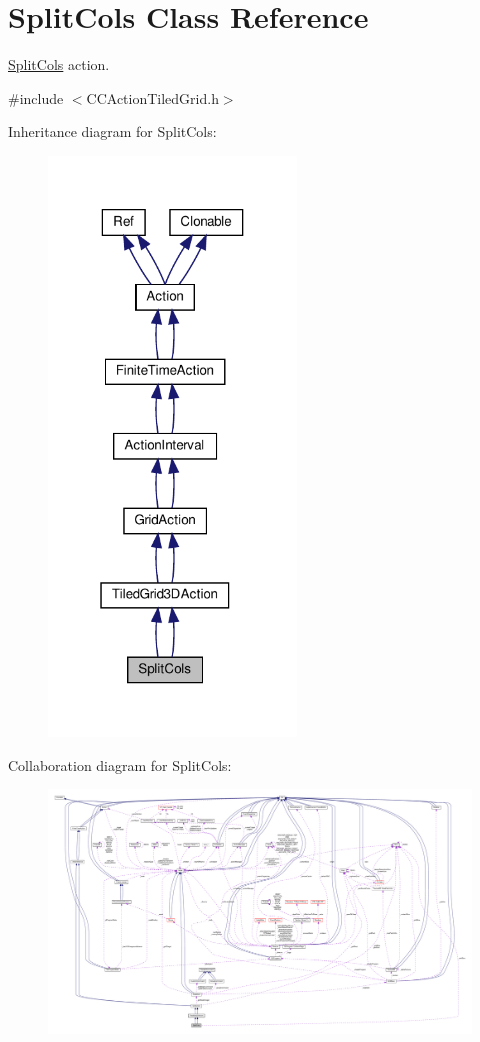 \hypertarget{classSplitCols}{}\section{Split\+Cols Class Reference}
\label{classSplitCols}


\hyperlink{classSplitCols}{Split\+Cols} action.  




{\ttfamily \#include $<$C\+C\+Action\+Tiled\+Grid.\+h$>$}



Inheritance diagram for Split\+Cols\+:
\nopagebreak
\begin{figure}[H]
\begin{center}
\leavevmode
\includegraphics[width=187pt]{classSplitCols__inherit__graph}
\end{center}
\end{figure}


Collaboration diagram for Split\+Cols\+:
\nopagebreak
\begin{figure}[H]
\begin{center}
\leavevmode
\includegraphics[width=350pt]{classSplitCols__coll__graph}
\end{center}
\end{figure}

